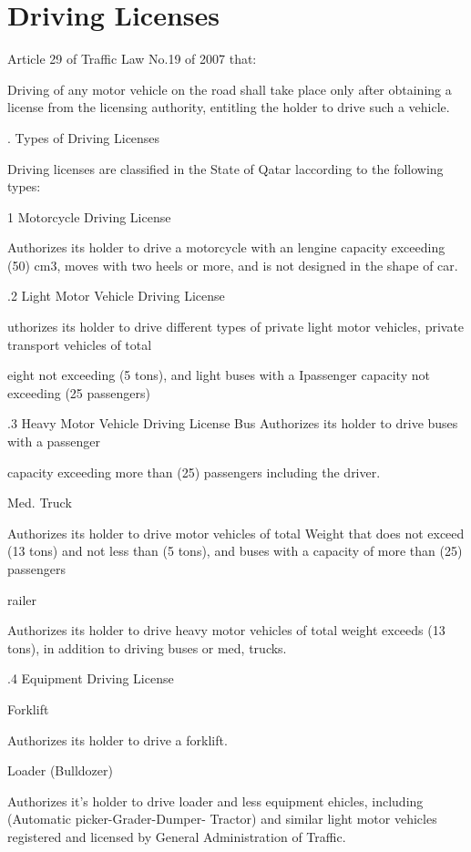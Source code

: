 \documentclass{book}
\begin{document}
\chapter{Driving Licenses}

Article 29 of Traffic Law No.19 of 2007 that:

Driving of any motor vehicle on the road shall take place only after
obtaining a license from the licensing authority, entitling the holder
to drive such a vehicle.



. Types of Driving Licenses

Driving licenses are classified in the State of Qatar laccording to the
following types:

1 Motorcycle Driving License

Authorizes its holder to drive a motorcycle with an lengine capacity
exceeding (50) cm3, moves with two heels or more, and is not designed in
the shape of car.

.2 Light Motor Vehicle Driving License

uthorizes its holder to drive different types of private light motor
vehicles, private transport vehicles of total

eight not exceeding (5 tons), and light buses with a Ipassenger capacity
not exceeding (25 passengers)

.3 Heavy Motor Vehicle Driving License Bus Authorizes its holder to
drive buses with a passenger

capacity exceeding more than (25) passengers including the driver.

Med. Truck

Authorizes its holder to drive motor vehicles of total Weight that does
not exceed (13 tons) and not less than (5 tons), and buses with a
capacity of more than (25) passengers

railer

Authorizes its holder to drive heavy motor vehicles of total weight
exceeds (13 tons), in addition to driving buses or med, trucks.

.4 Equipment Driving License

Forklift

Authorizes its holder to drive a forklift.

Loader (Bulldozer)

Authorizes it's holder to drive loader and less equipment ehicles,
including (Automatic picker-Grader-Dumper- Tractor) and similar light
motor vehicles registered and licensed by General Administration of
Traffic.
\end{document}
